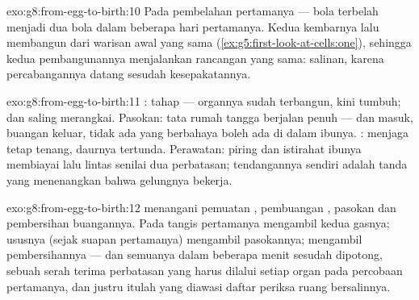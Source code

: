 \begin{solution}{exo:g8:from-egg-to-birth:10}
Pada pembelahan pertamanya --- bola  terbelah
menjadi dua bola dalam beberapa hari pertamanya. Kedua
kembarnya lalu membangun dari warisan  awal yang sama
(\cref{ex:g5:first-look-at-cells:one}), sehingga kedua
pembangunannya menjalankan rancangan yang sama: salinan,
karena percabangannya datang sesudah kesepakatannya.
\end{solution}

\begin{solution}{exo:g8:from-egg-to-birth:11}
: tahap  --- organnya sudah terbangun, kini
tumbuh;   dan   saling merangkai. Pasokan:
tata rumah tangga  berjalan penuh ---  dan
 masuk, buangan keluar, tidak ada yang berbahaya boleh
ada di dalam  ibunya. : menjaga  tetap
tenang, daurnya tertunda. Perawatan: piring dan istirahat
ibunya membiayai lalu lintas senilai dua perbatasan;
tendangannya sendiri adalah tanda yang menenangkan bahwa
gelungnya bekerja.
\end{solution}

\begin{solution}{exo:g8:from-egg-to-birth:12}
 menangani pemuatan , pembuangan , pasokan  dan pembersihan buangannya. Pada
tangis pertamanya  mengambil kedua gasnya;
ususnya (sejak suapan pertamanya) mengambil pasokannya;
 mengambil pembersihannya --- dan semuanya dalam
beberapa menit sesudah  dipotong, sebuah serah
terima perbatasan yang harus dilalui setiap organ pada
percobaan pertamanya, dan justru itulah yang diawasi daftar
periksa ruang bersalinnya.
\end{solution}

